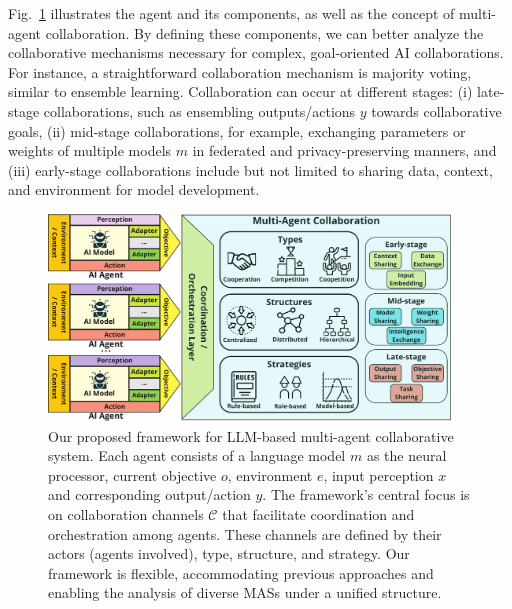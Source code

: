 \documentclass[acmsmall,nonacm]{acmart}
\begin{document}
    Fig.~\ref{fig:framework} illustrates the agent and its components, as well as the concept of multi-agent collaboration. By defining these components, we can better analyze the collaborative mechanisms necessary for complex, goal-oriented AI collaborations. For instance, a straightforward collaboration mechanism is majority voting, similar to ensemble learning. Collaboration can occur at different stages: (i) late-stage collaborations, such as ensembling outputs/actions $y$ towards collaborative goals, (ii) mid-stage collaborations, for example, exchanging parameters or weights of multiple models $m$ in federated and privacy-preserving manners, and (iii) early-stage collaborations include but not limited to sharing data, context, and environment for model development.

    \begin{figure}
        \includegraphics[width=0.95\textwidth]{image-lib/2024-MAC.pdf}
        \caption{Our proposed framework for LLM-based multi-agent collaborative system. Each agent consists of a language model $m$ as the neural processor, current objective $o$, environment $e$, input perception $x$ and corresponding output/action $y$. The framework's central focus is on collaboration channels $\mathcal{C}$ that facilitate coordination and orchestration among agents. These channels are defined by their actors (agents involved), type, structure, and strategy. Our framework is flexible, accommodating previous approaches and enabling the analysis of diverse MASs under a unified structure.}\label{fig:framework}
        \Description{}
    \end{figure}
\end{document}
